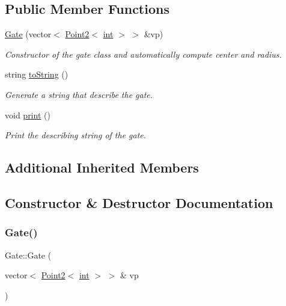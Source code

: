 \subsection*{Public Member Functions}
\begin{DoxyCompactItemize}
\item 
\mbox{\hyperlink{class_gate_aacece347527cf8093fdb3420bc95fb4b}{Gate}} (vector$<$ \mbox{\hyperlink{class_point2}{Point2}}$<$ \mbox{\hyperlink{draw_8hh_aa620a13339ac3a1177c86edc549fda9b}{int}} $>$ $>$ \&vp)
\begin{DoxyCompactList}\small\item\em Constructor of the gate class and automatically compute center and radius. \end{DoxyCompactList}\item 
string \mbox{\hyperlink{class_gate_a56194536f033ef34b9dfd23581afff5d}{to\+String}} ()
\begin{DoxyCompactList}\small\item\em Generate a string that describe the gate. \end{DoxyCompactList}\item 
void \mbox{\hyperlink{class_gate_afdf8579acddb7b4f5be42e861c2c1db2}{print}} ()
\begin{DoxyCompactList}\small\item\em Print the describing string of the gate. \end{DoxyCompactList}\end{DoxyCompactItemize}
\subsection*{Additional Inherited Members}


\subsection{Constructor \& Destructor Documentation}
\mbox{\label{class_gate_aacece347527cf8093fdb3420bc95fb4b}} 
\subsubsection{\texorpdfstring{Gate()}{Gate()}}
{\footnotesize\ttfamily Gate\+::\+Gate (\begin{DoxyParamCaption}\item[{vector$<$ \mbox{\hyperlink{class_point2}{Point2}}$<$ \mbox{\hyperlink{draw_8hh_aa620a13339ac3a1177c86edc549fda9b}{int}} $>$ $>$ \&}]{vp }\end{DoxyParamCaption})}



